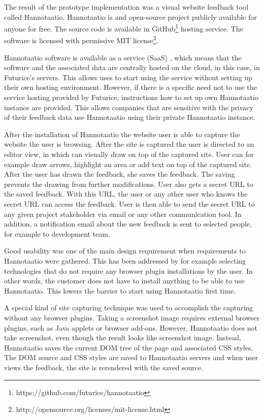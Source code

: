 \documentclass[english,12pt,a4paper,pdftex]{article}
\begin{document}
The result of the prototype implementation was a visual website feedback tool called Hannotaatio. Hannotaatio is and open-source project publicly available for anyone for free. The source code is available in GitHub\footnote{https://github.com/futurice/hannotaatio} hosting service. The software is licensed with permissive MIT license\footnote{http://opensource.org/licenses/mit-license.html}.

Hannotaatio software is available as a service (SaaS) \citep{saas}, which means that the software and the associated data are centrally hosted on the cloud, in this case, in Futurice's servers. This allows uses to start using the service without setting up their own hosting environment. However, if there is a specific need not to use the service hosting provided by Futurice, instructions how to set up own Hannotaatio instance are provided. This allows companies that are sensitive with the privacy of their feedback data use Hannotaatio using their private Hannotaatio instance.

After the installation of Hannotaatio the website user is able to capture the website the user is browsing. After the site is captured the user is directed to an editor view, in which can visually draw on top of the captured site. User can for example draw arrows, highlight an area or add text on top of the captured site. After the user has drawn the feedback, she saves the feedback. The saving prevents the drawing from further modifications. User also gets a secret \ac{URL} to the saved feedback. With this \ac{URL}, the user or any other user who knows the secret \ac{URL} can access the feedback. User is then able to send the secret \ac{URL} to any given project stakeholder via email or any other communication tool. In addition, a notification email about the new feedback is sent to selected people, for example to development team.

Good usability was one of the main design requirement when requirements to Hannotaatio were gathered. This has been addressed by for example selecting technologies that do not require any browser plugin installations by the user. In other words, the customer does not have to install anything to be able to use Hannotaatio. This lowers the barrier to start using Hannotaatio first time.

A special kind of site capturing technique was used to accomplish the capturing without any browser plugins. Taking a screenshot image requires external browser plugins, such as Java applets or browser add-ons. However, Hannotaatio does not take screenshot, even though the result looks like screenshot image. Instead, Hannotaatio saves the current \ac{DOM} tree of the page and associated \ac{CSS} styles. The \ac{DOM} source and \ac{CSS} styles are saved to Hannotaatio servers and when user views the feedback, the site is rerendered with the saved source.
\end{document}
